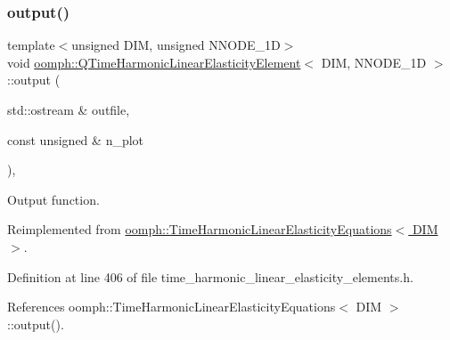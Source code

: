 \mbox{\label{classoomph_1_1QTimeHarmonicLinearElasticityElement_a7429278e0a38d0b934b574f421ea54c3}} 
\subsubsection{\texorpdfstring{output()}{output()}\hspace{0.1cm}{\footnotesize\ttfamily [2/4]}}
{\footnotesize\ttfamily template$<$unsigned D\+IM, unsigned N\+N\+O\+D\+E\+\_\+1D$>$ \\
void \hyperlink{classoomph_1_1QTimeHarmonicLinearElasticityElement}{oomph\+::\+Q\+Time\+Harmonic\+Linear\+Elasticity\+Element}$<$ D\+IM, N\+N\+O\+D\+E\+\_\+1D $>$\+::output (\begin{DoxyParamCaption}\item[{std\+::ostream \&}]{outfile,  }\item[{const unsigned \&}]{n\+\_\+plot }\end{DoxyParamCaption})\hspace{0.3cm}{\ttfamily [inline]}, {\ttfamily [virtual]}}



Output function. 



Reimplemented from \hyperlink{classoomph_1_1TimeHarmonicLinearElasticityEquations_a5363121911a4418e2bfa707e02e2adc4}{oomph\+::\+Time\+Harmonic\+Linear\+Elasticity\+Equations$<$ D\+I\+M $>$}.



Definition at line 406 of file time\+\_\+harmonic\+\_\+linear\+\_\+elasticity\+\_\+elements.\+h.



References oomph\+::\+Time\+Harmonic\+Linear\+Elasticity\+Equations$<$ D\+I\+M $>$\+::output().

\mbox{\label{classoomph_1_1QTimeHarmonicLinearElasticityElement_a1a8ff0960bcfd07a8c24ca74309f6594}} 
